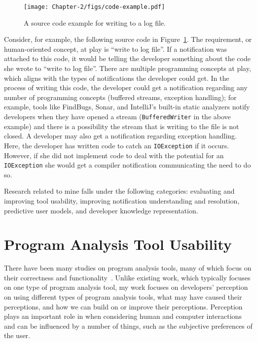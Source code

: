 \begin{figure} [ht]
	\centering
	\texttt{[image: Chapter-2/figs/code-example.pdf]}
	\caption{A source code example for writing to a log file.}
	\label{fig:code}
\end{figure}

Consider, for example, the following source code in Figure~\ref{fig:code}. The requirement, or human-oriented concept, at play is ``write to log file''. If a notification was attached to this code, it would be telling the developer something about the code she wrote to ``write to log file''.
There are multiple programming concepts at play, which aligns with the types of notifications the developer could get. 
In the process of writing this code, the developer could get a notification regarding any number of programming concepts (buffered streams, exception handling); for example, tools like FindBugs, Sonar, and IntelliJ's built-in static analyzers notify developers when they have opened a stream (\texttt{BufferedWriter} in the above example) and there is a possibility the stream that is writing to the file is not closed.
A developer may also get a notification regarding exception handling. Here, the developer has written code to catch an \texttt{IOException} if it occurs. However, if she did not implement code to deal with the potential for an \texttt{IOException} she would get a compiler notification communicating the need to do so.





Research related to mine falls under the following categories: evaluating and improving tool usability, improving notification understanding and resolution, predictive user models, and developer knowledge representation.

\section{Program Analysis Tool Usability}

There have been many studies on program analysis tools, many of which focus on
their correctness and functionality~\cite{Ayewah:2008:FindBugs,Bessey:2010:Coverity,dugan2000developing,luk2005pin}.
Unlike existing work, which typically focuses on one type of program analysis tool, my work focuses on developers' perception on 
using different types of program analysis tools, what may have caused their perceptions, and how we can build on or improve their perceptions. 
Perception plays an important role in when considering human and computer interactions~\cite{Dastani:2002:Perception} and
can be influenced by a number of things, such as the subjective preferences of
the user.

